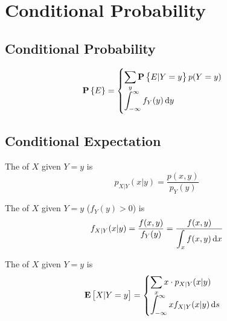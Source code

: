 \section{Conditional Probability}

\subsection{Conditional Probability}

\begin{theorem}
    \begin{equation}
        \probability{E} = \begin{cases}
            \displaystyle \sum_y \probability{E|Y = y} p(Y=y) \\
            \displaystyle \int_{-\infty}^\infty f_Y(y) \dif{y}
        \end{cases}
    \end{equation}    
\end{theorem}


\subsection{Conditional Expectation}

\begin{definition}
    The  of $X$ given $Y=y$ is 
    \begin{equation}
        \displaystyle p_{X|Y}(x|y) = \frac{p(x,y)}{p_Y (y)}
    \end{equation}
    
    The  of $X$ given $Y=y$ ($f_Y (y) > 0$) is 
    \begin{equation}
        \displaystyle f_{X|Y}(x|y) = \frac{f(x,y)}{f_Y (y)} = \frac{f(x,y)}{\displaystyle \int_x f(x,y) \dif{x}}
    \end{equation}
\end{definition}





\begin{definition}
    The  of $X$ given $Y=y$ is 
    \begin{equation}
        \displaystyle \expect{X|Y=y} = \begin{cases}
            \displaystyle \sum_x x \cdot p_{X|Y}(x|y) \\
            \displaystyle \int_{-\infty}^\infty x f_{X|Y} (x|y) \dif{s}
        \end{cases} 
    \end{equation}
\end{definition}

